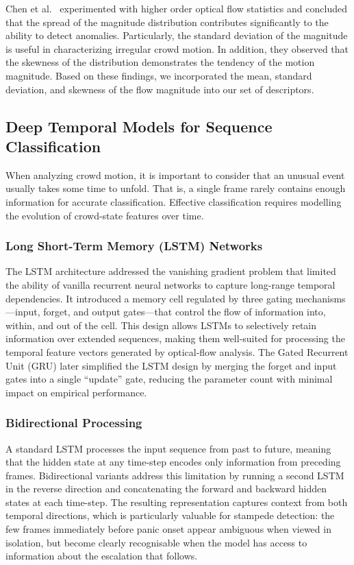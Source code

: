 Chen et al.\ \cite{chen2023opticalflow} experimented with higher order optical flow statistics and concluded that the spread of the magnitude distribution contributes significantly to the ability to detect anomalies. Particularly, the standard deviation of the magnitude is useful in characterizing irregular crowd motion. In addition, they observed that the skewness of the distribution demonstrates the tendency of the motion magnitude. Based on these findings, we incorporated the mean, standard deviation, and skewness of the flow magnitude into our set of descriptors.

\subsection{Deep Temporal Models for Sequence Classification}

When analyzing crowd motion, it is important to consider that an unusual event usually takes some time to unfold. That is, a single frame rarely contains enough information for accurate classification. Effective classification requires modelling the evolution of crowd-state features over time.

\subsubsection{Long Short-Term Memory (LSTM) Networks}
The LSTM architecture \cite{hochreiter1997long} addressed the vanishing gradient problem that limited the ability of vanilla recurrent neural networks to capture long-range temporal dependencies. It introduced a memory cell regulated by three gating mechanisms---input, forget, and output gates---that control the flow of information into, within, and out of the cell. This design allows LSTMs to selectively retain information over extended sequences, making them well-suited for processing the temporal feature vectors generated by optical-flow analysis. The Gated Recurrent Unit (GRU) \cite{cho2014gru} later simplified the LSTM design by merging the forget and input gates into a single ``update'' gate, reducing the parameter count with minimal impact on empirical performance.

\subsubsection{Bidirectional Processing}
A standard LSTM processes the input sequence from past to future, meaning that the hidden state at any time-step encodes only information from preceding frames. Bidirectional variants \cite{chung2014bilstm} address this limitation by running a second LSTM in the reverse direction and concatenating the forward and backward hidden states at each time-step. The resulting representation captures context from both temporal directions, which is particularly valuable for stampede detection: the few frames immediately before panic onset appear ambiguous when viewed in isolation, but become clearly recognisable when the model has access to information about the escalation that follows.

